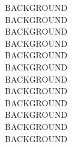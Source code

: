 \documentclass[acmtog]{techreportacmart}
\begin{document}
BACKGROUND \\
BACKGROUND \\
BACKGROUND \\
BACKGROUND \\
BACKGROUND \\
BACKGROUND \\
BACKGROUND \\
BACKGROUND \\
BACKGROUND \\
BACKGROUND \\
BACKGROUND \\
BACKGROUND \\





\end{document}
